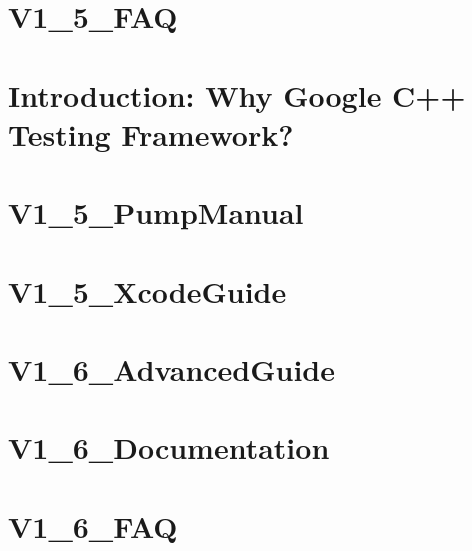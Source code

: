 \documentclass[twoside]{book}
\newcommand{\+}{\discretionary{\mbox{\scriptsize$\hookleftarrow$}}{}{}}
\begin{document}
\chapter{V1\+\_\+5\+\_\+\+F\+AQ}
\label{md_vendor_googletest_googletest_docs__v1_5__f_a_q}

\chapter{Introduction\+: Why Google C++ Testing Framework?}
\label{md_vendor_googletest_googletest_docs__v1_5__primer}

\chapter{V1\+\_\+5\+\_\+\+Pump\+Manual}
\label{md_vendor_googletest_googletest_docs__v1_5__pump_manual}

\chapter{V1\+\_\+5\+\_\+\+Xcode\+Guide}
\label{md_vendor_googletest_googletest_docs__v1_5__xcode_guide}

\chapter{V1\+\_\+6\+\_\+\+Advanced\+Guide}
\label{md_vendor_googletest_googletest_docs__v1_6__advanced_guide}

\chapter{V1\+\_\+6\+\_\+\+Documentation}
\label{md_vendor_googletest_googletest_docs__v1_6__documentation}

\chapter{V1\+\_\+6\+\_\+\+F\+AQ}
\label{md_vendor_googletest_googletest_docs__v1_6__f_a_q}

\end{document}
